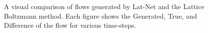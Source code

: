 \documentclass{article}
\begin{document}
\begin{figure}[!t]
\caption{A visual comparison of flows generated by Lat-Net and the Lattice Boltzmann method. Each figure shows the Generated, True, and Difference of the flow for various time-steps.}
\label{2d_image_plot}
\end{figure}
\end{document}

